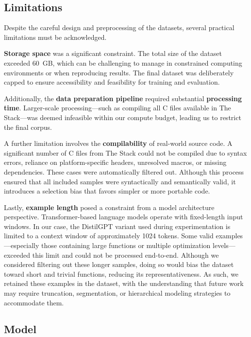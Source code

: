 \documentclass[../main.tex]{subfiles}
\begin{document}
\subsection{Limitations}

Despite the careful design and preprocessing of the datasets, several practical limitations must be acknowledged.

\textbf{Storage space} was a significant constraint. The total size of the dataset exceeded 60~GB, which can be challenging to manage in constrained computing environments or when reproducing results. The final dataset was deliberately capped to ensure accessibility and feasibility for training and evaluation.

Additionally, the \textbf{data preparation pipeline} required substantial \textbf{processing time}. Larger-scale processing---such as compiling all C files available in The Stack---was deemed infeasible within our compute budget, leading us to restrict the final corpus.

A further limitation involves the \textbf{compilability} of real-world source code. A significant number of C files from The Stack could not be compiled due to syntax errors, reliance on platform-specific headers, unresolved macros, or missing dependencies. These cases were automatically filtered out. Although this process ensured that all included samples were syntactically and semantically valid, it introduces a selection bias that favors simpler or more portable code.

Lastly, \textbf{example length} posed a constraint from a model architecture perspective. Transformer-based language models operate with fixed-length input windows. In our case, the DistilGPT \cite{sanh2019distilbert} variant used during experimentation is limited to a context window of approximately 1024 tokens. Some valid examples---especially those containing large functions or multiple optimization levels---exceeded this limit and could not be processed end-to-end. Although we considered filtering out these longer samples, doing so would bias the dataset toward short and trivial functions, reducing its representativeness. As such, we retained these examples in the dataset, with the understanding that future work may require truncation, segmentation, or hierarchical modeling strategies to accommodate them.

\subsection{Model}
\end{document}
